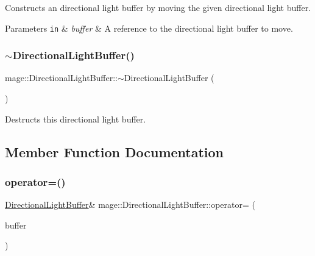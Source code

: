 Constructs an directional light buffer by moving the given directional light buffer.


\begin{DoxyParams}[1]{Parameters}
\mbox{\tt in}  & {\em buffer} & A reference to the directional light buffer to move. \\
\hline
\end{DoxyParams}
\hypertarget{structmage_1_1_directional_light_buffer_a6d9c1eb4b4b15c586524e5436d9d6162}{}\label{structmage_1_1_directional_light_buffer_a6d9c1eb4b4b15c586524e5436d9d6162} 
\subsubsection{\texorpdfstring{$\sim$\+Directional\+Light\+Buffer()}{~DirectionalLightBuffer()}}
{\footnotesize\ttfamily mage\+::\+Directional\+Light\+Buffer\+::$\sim$\+Directional\+Light\+Buffer (\begin{DoxyParamCaption}{ }\end{DoxyParamCaption})\hspace{0.3cm}{\ttfamily [default]}}

Destructs this directional light buffer. 

\subsection{Member Function Documentation}
\hypertarget{structmage_1_1_directional_light_buffer_ae076cdb33035cf8c7ce14750eaf3601a}{}\label{structmage_1_1_directional_light_buffer_ae076cdb33035cf8c7ce14750eaf3601a} 
\subsubsection{\texorpdfstring{operator=()}{operator=()}\hspace{0.1cm}{\footnotesize\ttfamily [1/2]}}
{\footnotesize\ttfamily \hyperlink{structmage_1_1_directional_light_buffer}{Directional\+Light\+Buffer}\& mage\+::\+Directional\+Light\+Buffer\+::operator= (\begin{DoxyParamCaption}\item[{const \hyperlink{structmage_1_1_directional_light_buffer}{Directional\+Light\+Buffer} \&}]{buffer }\end{DoxyParamCaption})\hspace{0.3cm}{\ttfamily [default]}}

